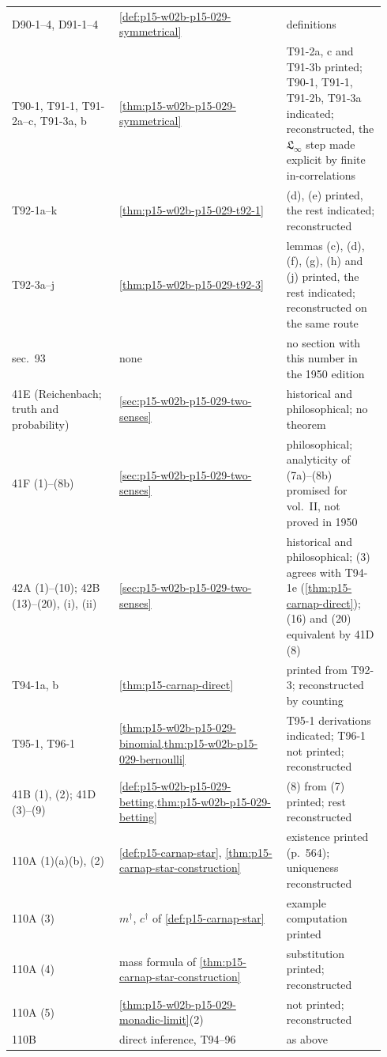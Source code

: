 \begin{center}
\begin{tabular}{@{}p{0.27\linewidth}p{0.42\linewidth}p{0.25\linewidth}@{}}
D90-1--4, D91-1--4 & \cref{def:p15-w02b-p15-029-symmetrical} &
definitions\\
T90-1, T91-1, T91-2a--c, T91-3a, b &
\cref{thm:p15-w02b-p15-029-symmetrical} & T91-2a, c and T91-3b printed;
T90-1, T91-1, T91-2b, T91-3a indicated; reconstructed, the
\(\mathfrak L_\infty\) step made explicit by finite in-correlations\\
T92-1a--k & \cref{thm:p15-w02b-p15-029-t92-1} & (d), (e) printed, the
rest indicated; reconstructed\\
T92-3a--j & \cref{thm:p15-w02b-p15-029-t92-3} & lemmas (c), (d), (f),
(g), (h) and (j) printed, the rest indicated; reconstructed on the same
route\\
sec.~93 & none & no section with this number in the 1950 edition\\
41E (Reichenbach; truth and probability) &
\cref{sec:p15-w02b-p15-029-two-senses} & historical and
philosophical; no theorem\\
41F (1)--(8b) & \cref{sec:p15-w02b-p15-029-two-senses} &
philosophical; analyticity of (7a)--(8b) promised for vol.~II, not
proved in 1950\\
42A (1)--(10); 42B (13)--(20), (i), (ii) &
\cref{sec:p15-w02b-p15-029-two-senses} & historical and philosophical;
(3) agrees with T94-1e (\cref{thm:p15-carnap-direct}); (16) and (20)
equivalent by 41D (8)\\
T94-1a, b & \cref{thm:p15-carnap-direct} & printed from T92-3;
reconstructed by counting\\
T95-1, T96-1 & \cref{thm:p15-w02b-p15-029-binomial,thm:p15-w02b-p15-029-bernoulli}
& T95-1 derivations indicated; T96-1 not printed; reconstructed\\
41B (1), (2); 41D (3)--(9) & \cref{def:p15-w02b-p15-029-betting,thm:p15-w02b-p15-029-betting}
& (8) from (7) printed; rest reconstructed\\
110A (1)(a)(b), (2) & \cref{def:p15-carnap-star},
\cref{thm:p15-carnap-star-construction} & existence printed (p.~564);
uniqueness reconstructed\\
110A (3) & \(m^\dagger\), \(c^\dagger\) of \cref{def:p15-carnap-star}
& example computation printed\\
110A (4) & mass formula of \cref{thm:p15-carnap-star-construction} &
substitution printed; reconstructed\\
110A (5) & \cref{thm:p15-w02b-p15-029-monadic-limit}(2) & not printed;
reconstructed\\
110B & direct inference, T94--96 & as above\\

\end{tabular}
\end{center}
